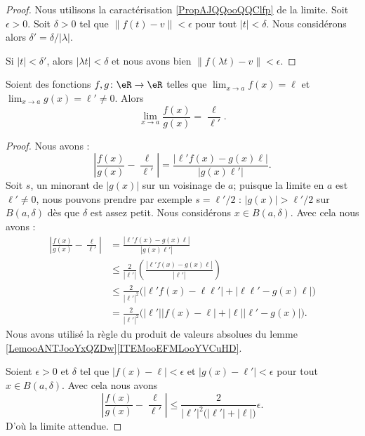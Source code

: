 \begin{proof}
	Nous utilisons la caractérisation \eqref{PropAJQQooQQClfp} de la limite. Soit \( \epsilon>0\). Soit \( \delta>0\) tel que \( \| f(t)-v \|<\epsilon\) pour tout \( | t |<\delta\). Nous considérons alors \( \delta'=\delta/| \lambda |\).

	Si \( | t |<\delta'\), alors \( | \lambda t |<\delta\) et nous avons bien \( \| f(\lambda t)-v \|<\epsilon\).
\end{proof}

\begin{proposition}      \label{PROPooOUPNooTrClHw}
	Soient des fonctions \( f,g\colon \eR\to \eR\) telles que \( \lim_{x\to a} f(x)=\ell\) et \( \lim_{x\to a} g(x)=\ell'\neq 0\). Alors
	\begin{equation}
		\lim_{x\to a} \frac{ f(x) }{ g(x) }=\frac{ \ell }{ \ell' }.
	\end{equation}
\end{proposition}

\begin{proof}
	Nous avons :
	\begin{equation}
		\left| \frac{ f(x) }{ g(x) }-\frac{ \ell }{ \ell' } \right| =\frac{ | \ell'f(x)-g(x)\ell | }{ |g(x)\ell'| }.
	\end{equation}
	Soit \( s\), un minorant de \( | g(x) |\) sur un voisinage de \( a\); puisque la limite en \( a\) est \( \ell'\neq 0\), nous pouvons prendre par exemple \( s=\ell'/2\) : \( | g(x) |>\ell'/2\) sur \( B(a,\delta)\) dès que \( \delta\) est assez petit. Nous considérons \( x\in B(a,\delta)\). Avec cela nous avons :
	\begin{subequations}
		\begin{align}
			\left| \frac{ f(x) }{ g(x) }-\frac{ \ell }{ \ell' } \right| & =\frac{ | \ell'f(x)-g(x)\ell | }{ |g(x)\ell'| }                                                 \\
			                                                            & \leq \frac{ 2 }{ | \ell' |} \left( \frac{ | \ell'f(x)-g(x)\ell | }{ | \ell' | } \right)         \\
			                                                            & \leq \frac{ 2 }{ | \ell' |^2 }\big( | \ell'f(x)-\ell\ell' |+| \ell\ell'-g(x)\ell | \big)        \\
			                                                            & =\frac{ 2 }{ | \ell' |^2 }\big( | \ell' | |f(x)-\ell |+| \ell | |\ell'-g(x) | \big).
		\end{align}
	\end{subequations}
    Nous avons utilisé la règle du produit de valeurs absolues du lemme \ref{LemooANTJooYxQZDw}\ref{ITEMooEFMLooYVCuHD}.

	Soient \( \epsilon>0\) et \( \delta\) tel que \( | f(x)-\ell |<\epsilon\) et \( | g(x)-\ell' |<\epsilon\) pour tout \( x\in B(a,\delta)\). Avec cela nous avons
	\begin{equation}
		\left| \frac{ f(x) }{ g(x) }-\frac{ \ell }{ \ell' } \right| \leq\frac{ 2 }{ | \ell' |^2\big( | \ell' |+| \ell | \big) }\epsilon.
	\end{equation}
	D'où la limite attendue.
\end{proof}

